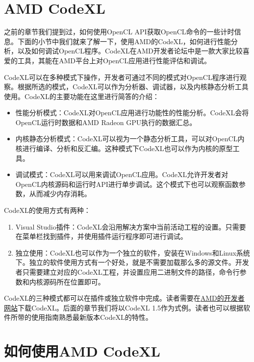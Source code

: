 \section{AMD CodeXL}

之前的章节我们提到过，如何使用OpenCL API获取OpenCL命令的一些计时信息。下面的小节中我们就来了解一下，使用AMD的CodeXL，如何进行性能分析，以及如何调试OpenCL程序。CodeXL在AMD开发者论坛中是一款大家比较喜爱的工具，其能在AMD平台上对OpenCL应用进行性能评估和调试。

CodeXL可以在多种模式下操作，开发者可通过不同的模式对OpenCL程序进行观察。根据所选的模式，CodeXL可以作为分析器、调试器，以及内核静态分析工具使用。CodeXL的主要功能在这里进行简答的介绍：

\begin{itemize}
\item 性能分析模式：CodeXL对OpenCL应用进行功能性的性能分析。CodeXL会将OpenCL运行时数据和AMD Radeon GPU执行的数据汇总。
\item 内核静态分析模式：CodeXL可以视为一个静态分析工具，可以对OpenCL内核进行编译、分析和反汇编。这种模式下CodeXL也可以作为内核的原型工具。
\item 调试模式：CodeXL可以用来调试OpenCL应用。CodeXL允许开发者对OpenCL内核源码和运行时API进行单步调试。这个模式下也可以观察函数参数，从而减少内存消耗。
\end{itemize}

CodeXL的使用方式有两种：

\begin{enumerate}
\item Visual Studio插件：CodeXL会沿用解决方案中当前活动工程的设置。只需要在菜单栏找到插件，并使用插件运行程序即可进行调试。
\item 独立使用：CodeXL也可以作为一个独立的软件，安装在Windows和Linux系统下。独立的软件使用方式有一个好处，就是不需要加载那么多的源文件。开发者只需要建立对应的CodeXL工程，并设置应用二进制文件的路径，命令行参数和内核源码所在位置即可。
\end{enumerate}

CodeXL的三种模式都可以在插件或独立软件中完成。读者需要在\href{http://developer.amd.com}{AMD的开发者网站}下载CodeXL。后面的章节我们将以CodeXL 1.5作为式例。读者也可以根据软件所带的使用指南熟悉最新版本CodeXL的特性。



\section{如何使用AMD CodeXL}

